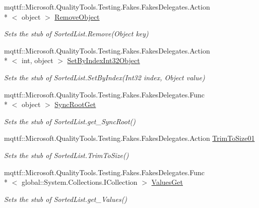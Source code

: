 \begin{DoxyCompactItemize}
mqttf\-::\-Microsoft.\-Quality\-Tools.\-Testing.\-Fakes.\-Fakes\-Delegates.\-Action\\*
$<$ object $>$ \hyperlink{class_system_1_1_collections_1_1_fakes_1_1_stub_sorted_list_abed22ddadd7ce9d92b4cdf698abe5b31}{Remove\-Object}
\begin{DoxyCompactList}\small\item\em Sets the stub of Sorted\-List.\-Remove(\-Object key)\end{DoxyCompactList}\item 
mqttf\-::\-Microsoft.\-Quality\-Tools.\-Testing.\-Fakes.\-Fakes\-Delegates.\-Action\\*
$<$ int, object $>$ \hyperlink{class_system_1_1_collections_1_1_fakes_1_1_stub_sorted_list_ae63353de2d6de4455d9ef40bc449f3ac}{Set\-By\-Index\-Int32\-Object}
\begin{DoxyCompactList}\small\item\em Sets the stub of Sorted\-List.\-Set\-By\-Index(\-Int32 index, Object value)\end{DoxyCompactList}\item 
mqttf\-::\-Microsoft.\-Quality\-Tools.\-Testing.\-Fakes.\-Fakes\-Delegates.\-Func\\*
$<$ object $>$ \hyperlink{class_system_1_1_collections_1_1_fakes_1_1_stub_sorted_list_a3ab66093e997642c9a75494d5644f4d2}{Sync\-Root\-Get}
\begin{DoxyCompactList}\small\item\em Sets the stub of Sorted\-List.\-get\-\_\-\-Sync\-Root()\end{DoxyCompactList}\item 
mqttf\-::\-Microsoft.\-Quality\-Tools.\-Testing.\-Fakes.\-Fakes\-Delegates.\-Action \hyperlink{class_system_1_1_collections_1_1_fakes_1_1_stub_sorted_list_a8c16d1269987886ff563330b3c59d4e0}{Trim\-To\-Size01}
\begin{DoxyCompactList}\small\item\em Sets the stub of Sorted\-List.\-Trim\-To\-Size()\end{DoxyCompactList}\item 
mqttf\-::\-Microsoft.\-Quality\-Tools.\-Testing.\-Fakes.\-Fakes\-Delegates.\-Func\\*
$<$ global\-::\-System.\-Collections.\-I\-Collection $>$ \hyperlink{class_system_1_1_collections_1_1_fakes_1_1_stub_sorted_list_ae33b88e3ebc730ea958b6ff59eb956dd}{Values\-Get}
\begin{DoxyCompactList}\small\item\em Sets the stub of Sorted\-List.\-get\-\_\-\-Values()\end{DoxyCompactList}\end{DoxyCompactItemize}
